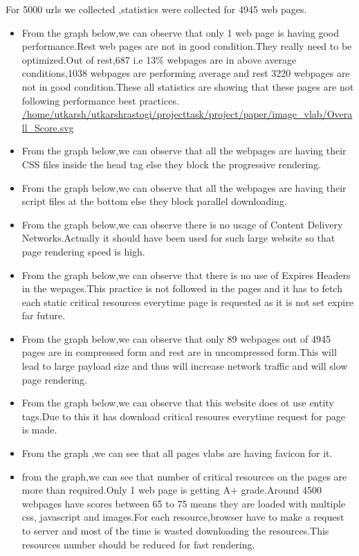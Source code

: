 \documentclass[11pt]{article}
\begin{document}
 For 5000 urls we collected ,statistics were collected for 4945 web pages.
\begin{itemize}
\item From the graph below,we can observe that only 1 web page is having good performance.Rest web pages are not in good condition.They really need to be optimized.Out of rest,687 i.e 13\% webpages are in above average conditions,1038 webpages are performing average and rest 3220 webpages are not in good condition.These all statistics are showing that these pages are not following performance best practices.  
  \href{file://./home/utkarsh/utkarshrastogi/projecttask/project/paper/image\_vlab/Overall\_Score.svg}{/home/utkarsh/utkarshrastogi/projecttask/project/paper/image\_vlab/Overall\_Score.svg}
\item From the graph below,we can observe that all the webpages are having their CSS files inside the head tag else they block the progressive rendering.
\item From the graph below,we can observe that all the webpages are having their script files at the bottom else they block parallel downloading.
\item From the graph below,we can observe there is no usage of Content Delivery Networks.Actually it should have been used for such large website so that page rendering speed is high.
\item From the graph below,we can observe that there is no use of Expires Headers in the wepages.This practice is not followed in the pages and it has to fetch each static critical resources everytime page is requested as it is not set expire far future.
\item From the graph below,we can observe that only 89 webpages out of 4945 pages are in compressed form and rest are in uncompressed form.This will lead to large payload size and thus will increase network traffic and will slow page rendering.
\item From the graph below,we can observe that this website does ot use entity tags.Due to this it has download critical resoures everytime request for page is made.
\item From the graph ,we can see that all pages vlabs are having favicon for it.
\item from the graph,we can see that number of critical resources  on the pages are more than required.Only 1 web page is getting A+ grade.Around 4500 webpages have scores between 65 to 75 means they are loaded with multiple css, javascript and images.For each resource,browser have to make a request to server and most of the time is wasted downloading the resources.This resources  number should be reduced for fast rendering.
\end{itemize}
\end{document}
